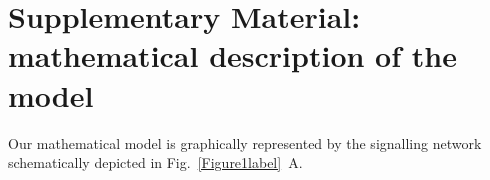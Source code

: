\documentclass[oneside, 10pt, a4paper, twocolumn]{article}
\begin{document}
\clearpage



\section{Supplementary Material: mathematical description of the model}
\label{Tables}

Our mathematical model is graphically represented by 
the signalling network schematically depicted in Fig.~\ref{Figure1label}~A. %
\end{document}
